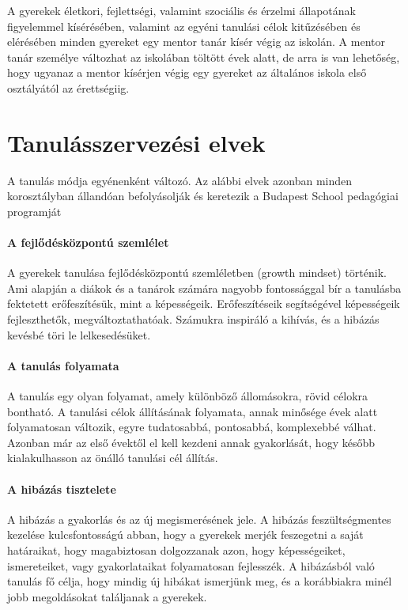 A gyerekek életkori, fejlettségi, valamint szociális és érzelmi
állapotának figyelemmel kísérésében, valamint az egyéni tanulási célok
kitűzésében és elérésében minden gyereket egy mentor tanár kísér végig
az iskolán. A mentor tanár személye változhat az iskolában töltött évek
alatt, de arra is van lehetőség, hogy ugyanaz a mentor kísérjen végig
egy gyereket az általános iskola első osztályától az érettségiig.


\section{Tanulásszervezési elvek}
\label{sec:tanulasszervezesi_elvek}
A tanulás módja egyénenként változó. Az alábbi elvek azonban minden
korosztályban állandóan befolyásolják és keretezik a Budapest School
pedagógiai programját

\paragraph{A fejlődésközpontú szemlélet}

A gyerekek tanulása fejlődésközpontú szemléletben (growth mindset)
történik. Ami alapján a diákok és a tanárok számára nagyobb fontossággal
bír a tanulásba fektetett erőfeszítésük, mint a képességeik.
Erőfeszítéseik segítségével képességeik fejleszthetők,
megváltoztathatóak. Számukra inspiráló a kihívás, és a hibázás kevésbé
töri le lelkesedésüket.

\paragraph{A tanulás folyamata}

A tanulás egy olyan folyamat, amely különböző állomásokra, rövid célokra
bontható. A tanulási célok állításának folyamata, annak minősége évek
alatt folyamatosan változik, egyre tudatosabbá, pontosabbá, komplexebbé
válhat. Azonban már az első évektől el kell kezdeni annak gyakorlását,
hogy később kialakulhasson az önálló tanulási cél állítás.

\paragraph{A hibázás tisztelete}

A hibázás a gyakorlás és az új megismerésének jele. A hibázás
feszültségmentes kezelése kulcsfontosságú abban, hogy a gyerekek merjék
feszegetni a saját határaikat, hogy magabiztosan dolgozzanak azon, hogy
képességeiket, ismereteiket, vagy gyakorlataikat folyamatosan
fejlesszék. A hibázásból való tanulás fő célja, hogy mindig új hibákat
ismerjünk meg, és a korábbiakra minél jobb megoldásokat találjanak a
gyerekek.

